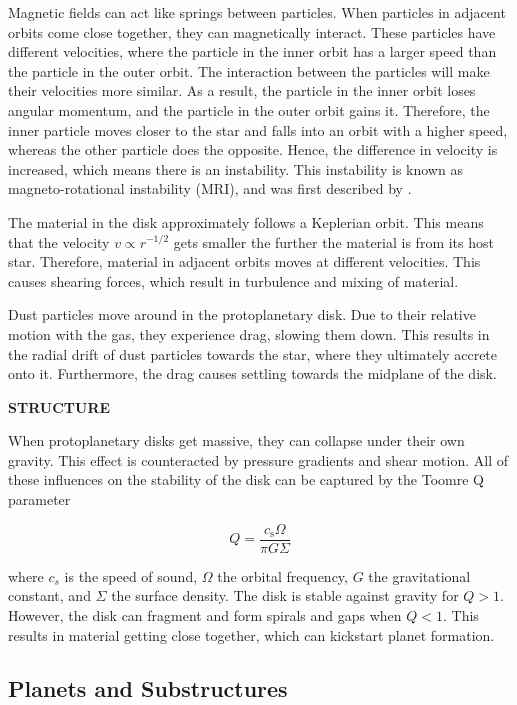 \documentclass[oneside, single, authoryear, semicolon, 12pt]{lion-msc}
\newcommand{\4}{$_4$}
\newcommand{\3}{$_3$}
\newcommand{\2}{$_2$}
\begin{document}
Magnetic fields can act like springs between particles. When particles in adjacent orbits come close together, they can magnetically interact. These particles have different velocities, where the particle in the inner orbit has a larger speed than the particle in the outer orbit. The interaction between the particles will make their velocities more similar. As a result, the particle in the inner orbit loses angular momentum, and the particle in the outer orbit gains it. Therefore, the inner particle moves closer to the star and falls into an orbit with a higher speed, whereas the other particle does the opposite. Hence, the difference in velocity is increased, which means there is an instability. This instability is known as magneto-rotational instability (MRI), and was first described by \cite{RevModPhys.70.1}. 

The material in the disk approximately follows a Keplerian orbit. This means that the velocity $v \propto r^{-1/2}$ gets smaller the further the material is from its host star. Therefore, material in adjacent orbits moves at different velocities. This causes shearing forces, which result in turbulence and mixing of material.  

Dust particles move around in the protoplanetary disk. Due to their relative motion with the gas, they experience drag, slowing them down. This results in the radial drift of dust particles towards the star, where they ultimately accrete onto it. Furthermore, the drag causes settling towards the midplane of the disk. 

\textbf{STRUCTURE}

When protoplanetary disks get massive, they can collapse under their own gravity. This effect is counteracted by pressure gradients and shear motion. All of these influences on the stability of the disk can be captured by the Toomre Q parameter

\begin{equation}
    Q = \frac{c_\mathrm{s}\Omega}{\pi G\Sigma}
\end{equation}

where $c_s$ is the speed of sound, $\Omega$ the orbital frequency, $G$ the gravitational constant, and $\Sigma$ the surface density. The disk is stable against gravity for $Q>1$. However, the disk can fragment and form spirals and gaps when $Q<1$. This results in material getting close together, which can kickstart planet formation.

\subsection{Planets and Substructures}
\end{document}
